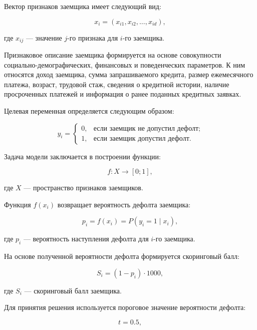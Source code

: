 Вектор признаков заемщика имеет следующий вид:

\begin{equation}
  x_i = (x_{i1}, x_{i2}, \ldots, x_{id}),
\end{equation}

\noindent где $x_{ij}$ --- значение $j$-го признака для $i$-го заемщика.

Признаковое описание заемщика формируется на основе совокупности социально-демографических, финансовых и поведенческих параметров. К ним относятся доход заемщика, сумма запрашиваемого кредита, размер ежемесячного платежа, возраст, трудовой стаж, сведения о кредитной истории, наличие просроченных платежей и информация о ранее поданных кредитных заявках.

Целевая переменная определяется следующим образом:

\begin{equation}
  y_i =
  \begin{cases}
    0, & \text{если заемщик не допустил дефолт;} \\
    1, & \text{если заемщик допустил дефолт.}
  \end{cases}
\end{equation}

Задача модели заключается в построении функции:

\begin{equation}
  f: X \rightarrow [0;1],
\end{equation}

\noindent где $X$ --- пространство признаков заемщиков.

Функция $f(x_i)$ возвращает вероятность дефолта заемщика:

\begin{equation}
  p_i = f(x_i) = P(y_i = 1 \mid x_i),
\end{equation}

\noindent где $p_i$ --- вероятность наступления дефолта для $i$-го заемщика.

На основе полученной вероятности дефолта формируется скоринговый балл:

\begin{equation}
  S_i = (1 - p_i) \cdot 1000,
\end{equation}

\noindent где $S_i$ --- скоринговый балл заемщика.

Для принятия решения используется пороговое значение вероятности дефолта:

\begin{equation}
  t = 0.5,
\end{equation}

